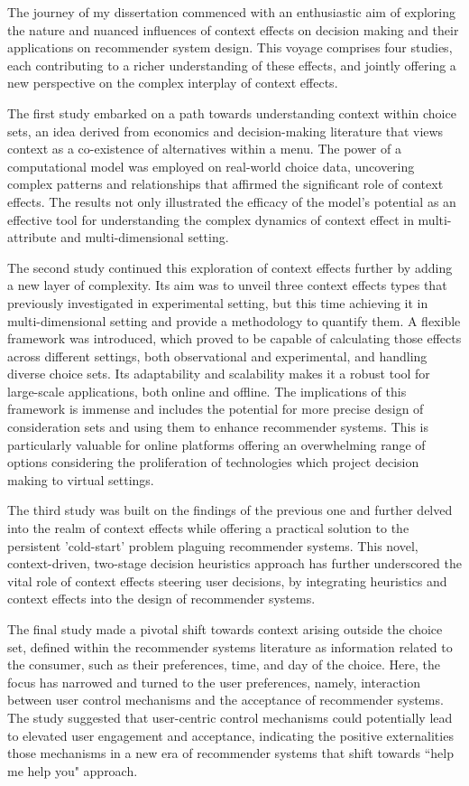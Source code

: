 \documentclass[a4paper,12pt]{article}
\begin{document}
The journey of my dissertation commenced with an enthusiastic aim of exploring the nature and nuanced influences of context effects on decision making and their applications on recommender system design. This voyage comprises four studies, each contributing to a richer understanding of these effects, and jointly offering a new perspective on the complex interplay of context effects.

The first study embarked on a path towards understanding context within choice sets, an idea derived from economics and decision-making literature that views context as a co-existence of alternatives within a menu. The power of a computational model was employed on real-world choice data, uncovering complex patterns and relationships that affirmed the significant role of context effects. The results not only illustrated the efficacy of the model's potential as an effective tool for understanding the complex dynamics of context effect in multi-attribute and multi-dimensional setting.

The second study continued this exploration of context effects further by adding a new layer of complexity. Its aim was to unveil three context effects types that previously investigated in experimental setting, but this time achieving it in multi-dimensional setting and provide a methodology to quantify them. A flexible framework was introduced, which proved to be capable of calculating those effects across different settings, both observational and experimental, and handling diverse choice sets. Its adaptability and scalability makes it a robust tool for large-scale applications, both online and offline. The implications of this framework is immense and includes the potential for more precise design of consideration sets and using them to enhance recommender systems. This is particularly valuable for online platforms offering an overwhelming range of options considering the proliferation of technologies which project decision making to virtual settings.

The third study was built on the findings of the previous one and further delved into the realm of context effects while offering a practical solution to the persistent 'cold-start' problem plaguing  recommender systems. This novel, context-driven, two-stage decision heuristics approach has further underscored the vital role of context effects steering user decisions, by integrating heuristics and context effects into the design of recommender systems.

The final study made a pivotal shift towards context arising outside the choice set, defined within the recommender systems literature as information related to the consumer, such as their preferences, time, and day of the choice. Here, the focus has narrowed and turned to the user preferences, namely, interaction between user control mechanisms and the acceptance of recommender systems. The study suggested that user-centric control mechanisms could potentially lead to elevated user engagement and acceptance, indicating the positive externalities those mechanisms in a new era of recommender systems that shift towards ``help me help you" approach.
\end{document}
